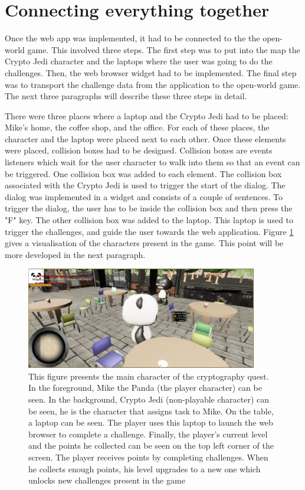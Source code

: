 \documentclass{l4proj}
\begin{document}
\section{Connecting everything together}

Once the web app was implemented, it had to be connected to the the open-world game.
This involved three steps. The first step was to put into the map the Crypto Jedi character and the laptops 
where the user was going to do the challenges. Then, the web browser widget had to be implemented. 
The final step was to transport the challenge data from the application to the open-world game.
The next three paragraphs will describe these three steps in detail.

There were three places where a laptop and the Crypto Jedi had to be placed: Mike's home, the coffee shop, and the office.
For each of these places, the character and the laptop were placed next to each other.
Once these elements were placed, collision boxes had to be designed.
Collision boxes are events listeners which wait for the user character to walk into them so that an event can be triggered.
One collision box was added to each element. 
The collision box associated with the Crypto Jedi is used to trigger the start of the dialog.
The dialog was implemented in a widget and consists of a couple of sentences.
To trigger the dialog, the user has to be inside the collision box and then press the "F" key.
The other collision box was added to the laptop. 
This laptop is used to trigger the challenges, and guide the user towards the web application.
Figure \ref{fig:GameStory} gives a visualisation of the characters present in the game.
This point will be more developed in the next paragraph.

\begin{figure}[]
    \centering
    \includegraphics[width=0.9\textwidth, frame]{images/GameImage.PNG}
    \caption{This figure presents the main character of the cryptography quest.
    In the foreground, Mike the Panda (the player character) can be seen.
    In the background, Crypto Jedi (non-playable character) can be seen,
    he is the character that assigns task to Mike.
    On the table, a laptop can be seen. The player uses this laptop 
    to launch the web browser to complete a challenge.
    Finally, the player's current level and the points he collected can be seen 
    on the top left corner of the screen. 
    The player receives points by completing challenges. 
    When he collects enough points, his level upgrades to a new one 
    which unlocks new challenges present in the game}
    \label{fig:GameStory}
\end{figure}
\end{document}
